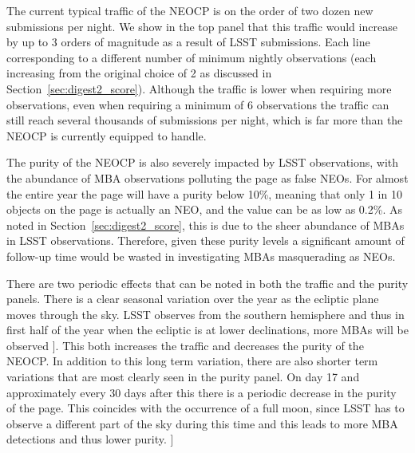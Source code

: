 \documentclass[twocolumn]{aastex631}
\newcommand{\todo}[1]{{\color{red}{[TODO: #1}]}}
\begin{document}
The current typical traffic of the NEOCP is on the order of two dozen new submissions per night. We show in the top panel that this traffic would increase by up to 3 orders of magnitude as a result of LSST submissions. Each line corresponding to a different number of minimum nightly observations (each increasing from the original choice of 2 as discussed in Section~\ref{sec:digest2_score}). Although the traffic is lower when requiring more observations, even when requiring a minimum of 6 observations the traffic can still reach several thousands of submissions per night, which is far more than the NEOCP is currently equipped to handle.

The purity of the NEOCP is also severely impacted by LSST observations, with the abundance of MBA observations polluting the page as false NEOs. For almost the entire year the page will have a purity below 10\%, meaning that only 1 in 10 objects on the page is actually an NEO, and the value can be as low as 0.2\%. As noted in Section~\ref{sec:digest2_score}, this is due to the sheer abundance of MBAs in LSST observations. Therefore, given these purity levels a significant amount of follow-up time would be wasted in investigating MBAs masquerading as NEOs.

There are two periodic effects that can be noted in both the traffic and the purity panels. There is a clear seasonal variation over the year as the ecliptic plane moves through the sky. LSST observes from the southern hemisphere and thus in first half of the year when the ecliptic is at lower declinations, more MBAs will be observed \todo{@Mario I think this I have this backwards, ecliptic is high in July right? ...but the traffic definitely peaks in the first half??}. This both increases the traffic and decreases the purity of the NEOCP. In addition to this long term variation, there are also shorter term variations that are most clearly seen in the purity panel. On day 17 and approximately every 30 days after this there is a periodic decrease in the purity of the page. This coincides with the occurrence of a full moon, since LSST has to observe a different part of the sky during this time and this leads to more MBA detections and thus lower purity. \todo{I left this a bit handwavy, need to check with Mario}
\end{document}
